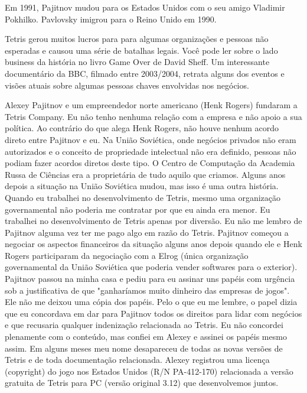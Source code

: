 \documentclass[
	12pt,				%
	openright,			%
	oneside,			%
	a4paper,			%
	brazil,				%
	]{abntex2}
\begin{document}
Em 1991, Pajitnov mudou para os Estados Unidos com o seu amigo Vladimir Pokhilko. Pavlovsky imigrou para o Reino Unido em 1990.

Tetris gerou muitos lucros para para algumas organizações e pessoas não esperadas e causou uma série de batalhas legais. Você pode ler sobre o lado business da história no livro Game Over de David Sheff. Um interessante documentário da BBC, filmado entre 2003/2004, retrata alguns dos eventos e visões atuais sobre algumas pessoas chaves envolvidas nos negócios.

Alexey Pajitnov e um empreendedor norte americano (Henk Rogers) fundaram a Tetris Company. Eu não tenho nenhuma relação com a empresa e não apoio a sua política. Ao contrário do que alega Henk Rogers, não houve nenhum acordo direto entre Pajitnov e eu. Na União Soviética, onde negócios privados não eram autorizados e o conceito de propriedade intelectual não era definido, pessoas não podiam fazer acordos diretos deste tipo. O Centro de Computação da Academia Russa de Ciências era a proprietária de tudo aquilo que criamos. Alguns anos depois a situação na União Soviética mudou, mas isso é uma outra história. Quando eu trabalhei no desenvolvimento de Tetris, mesmo uma organização governamental não poderia me contratar por que eu ainda era menor. Eu trabalhei no desenvolvimento de Tetris apenas por diversão. Eu não me lembro de Pajitnov alguma vez ter me pago algo em razão do Tetris. Pajitnov começou a negociar os aspectos financeiros da situação alguns anos depois quando ele e Henk Rogers participaram da negociação com a Elrog (única organização governamental da União Soviética que poderia vender softwares para o exterior). Pajitnov passou na minha casa e pediu para eu assinar uns papéis com urgência sob a justificativa de que "ganharíamos muito dinheiro das empresas de jogos". Ele não me deixou uma cópia dos papéis. Pelo o que eu me lembre, o papel dizia que eu concordava em dar para Pajitnov todos os direitos para lidar com negócios e que recusaria qualquer indenização relacionada ao Tetris. Eu não concordei plenamente com o conteúdo, mas confiei em Alexey e assinei os papéis mesmo assim. Em alguns meses meu nome desapareceu de todas as novas versões de Tetris e de toda documentação relacionada. Alexey registrou uma licença (copyright) do jogo nos Estados Unidos (R/N PA-412-170) relacionada a versão gratuita de Tetris para PC (versão original 3.12) que desenvolvemos juntos.
\end{document}
